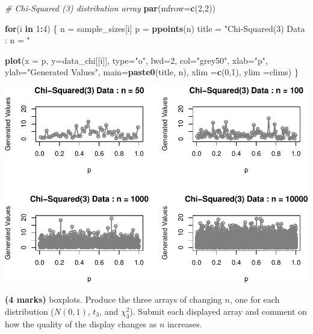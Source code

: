 \documentclass[9pt,letter]{article}
\newenvironment{Shaded}{\begin{snugshade}}{\end{snugshade}}
\newcommand{\KeywordTok}[1]{\textcolor[rgb]{0.13,0.29,0.53}{\textbf{#1}}}
\newcommand{\DataTypeTok}[1]{\textcolor[rgb]{0.13,0.29,0.53}{#1}}
\newcommand{\DecValTok}[1]{\textcolor[rgb]{0.00,0.00,0.81}{#1}}
\newcommand{\StringTok}[1]{\textcolor[rgb]{0.31,0.60,0.02}{#1}}
\newcommand{\CommentTok}[1]{\textcolor[rgb]{0.56,0.35,0.01}{\textit{#1}}}
\newcommand{\ControlFlowTok}[1]{\textcolor[rgb]{0.13,0.29,0.53}{\textbf{#1}}}
\newcommand{\OperatorTok}[1]{\textcolor[rgb]{0.81,0.36,0.00}{\textbf{#1}}}
\newcommand{\NormalTok}[1]{#1}
\begin{document}
\begin{Shaded}
\begin{Highlighting}[]
\CommentTok{# Chi-Squared (3) distribution array}
\KeywordTok{par}\NormalTok{(}\DataTypeTok{mfrow=}\KeywordTok{c}\NormalTok{(}\DecValTok{2}\NormalTok{,}\DecValTok{2}\NormalTok{))}

\ControlFlowTok{for}\NormalTok{(i }\ControlFlowTok{in} \DecValTok{1}\OperatorTok{:}\DecValTok{4}\NormalTok{) \{}
\NormalTok{  n =}\StringTok{ }\NormalTok{sample_sizes[i]}
\NormalTok{  p =}\StringTok{ }\KeywordTok{ppoints}\NormalTok{(n)}
\NormalTok{  title =}\StringTok{ "Chi-Squared(3) Data : n = "}
  
  \KeywordTok{plot}\NormalTok{(}\DataTypeTok{x =}\NormalTok{ p, }\DataTypeTok{y=}\NormalTok{data_chi[[i]], }
      \DataTypeTok{type=}\StringTok{"o"}\NormalTok{, }\DataTypeTok{lwd=}\DecValTok{2}\NormalTok{, }\DataTypeTok{col=}\StringTok{"grey50"}\NormalTok{,}
      \DataTypeTok{xlab=}\StringTok{"p"}\NormalTok{, }\DataTypeTok{ylab=}\StringTok{"Generated Values"}\NormalTok{,}
      \DataTypeTok{main=}\KeywordTok{paste0}\NormalTok{(title, n),}
      \DataTypeTok{xlim =}\KeywordTok{c}\NormalTok{(}\DecValTok{0}\NormalTok{,}\DecValTok{1}\NormalTok{), }\DataTypeTok{ylim =}\NormalTok{clims)}
\NormalTok{\}}
\end{Highlighting}
\end{Shaded}

\includegraphics{a3_solutions_files/figure-latex/unnamed-chunk-7-3.pdf}

\item 

\textbf{(4 marks)} boxplots. Produce the three arrays of changing \(n\),
one for each distribution (\(N(0,1)\), \(t_3\), and \(\chi^2_3\)).
Submit each displayed array and comment on how the quality of the
display changes as \(n\) increases.
\end{document}
